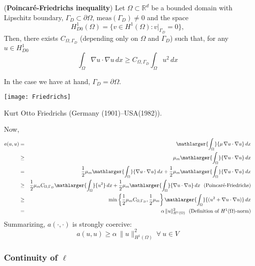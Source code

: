 \begin{theorem}
 (\textbf{Poincar\'e-Friedrichs inequality})
Let $\Omega \subset \mathbb{R}^d$ be a bounded domain with Lipschitz boundary,
$\Gamma_D \subset \partial{\Omega}$, $\mbox{meas}(\Gamma_D) \ne 0$
and the space
\begin{equation}
H^1_{D0}(\Omega) = \{v \in H^1(\Omega) : v|_{\Gamma_D} = 0 \}, \nonumber
\end{equation}
Then, there exists $C_{\Omega,\Gamma_D}$ (depending only on $\Omega$ and $\Gamma_D$)
such that, for any $u \in H^1_{D0}$
\begin{equation}
\int_{\Omega}{\nabla{u} \cdot \nabla{u}}\,dx \ge C_{\Omega,\Gamma_D}\int_{\Omega}{u^2}\,dx 
\end{equation}
\end{theorem}
In the case we have at hand, $\Gamma_D = \partial{\Omega}$.
\begin{marginfigure}[-2.0cm]
       \texttt{[image: Friedrichs]}
       \caption[]{Kurt Otto Friedrichs (Germany (1901)--USA(1982)).} 
\end{marginfigure}
Now, 
\begin{eqnarray*}
a(u,u) & = & \mathlarger{\int_{\Omega}}{\mu\,\nabla{u}\cdot \nabla{u}}\,dx \\
       & \ge & \mu_m \mathlarger{\int_{\Omega}}{\nabla{u} \cdot \nabla{u}}\,dx \\
       & = & \frac12 \mu_m \mathlarger{\int_{\Omega}}{\nabla{u} \cdot \nabla{u}}\,dx + \frac12 \mu_m \mathlarger{\int_{\Omega}}{\nabla{u} \cdot \nabla{u}}\,dx  \\
       & \ge & \frac12 \mu_m C_{\Omega,\Gamma_D} \mathlarger{\int_{\Omega}}{u^2}\,dx + \frac12 \mu_m \mathlarger{\int_{\Omega}}{\nabla{u} \cdot \nabla{u}}\,dx~~\mbox{(Poincar\'e-Friedrichs)} \\
       & \ge & \min\left\{ \frac12 \mu_m C_{\Omega,\Gamma_D},\frac12 \mu_m \right  \} \mathlarger{\int_{\Omega}}{(u^2 + \nabla{u} \cdot \nabla{u}) }\,dx \\
       & = & \alpha \,\lVert u \rVert_{H^1(\Omega)}^2~~\mbox{(Definition of $H^1(\Omega)$-norm)} 
\end{eqnarray*}
Summarizing, $a(\cdot,\cdot)$ is strongly coercive:
\begin{equation}
a(u,u) \ge \alpha \,\lVert u \rVert^2_{H^1(\Omega)}~\forall~u \in V
\end{equation}

\subsubsection{Continuity of $\ell$}

